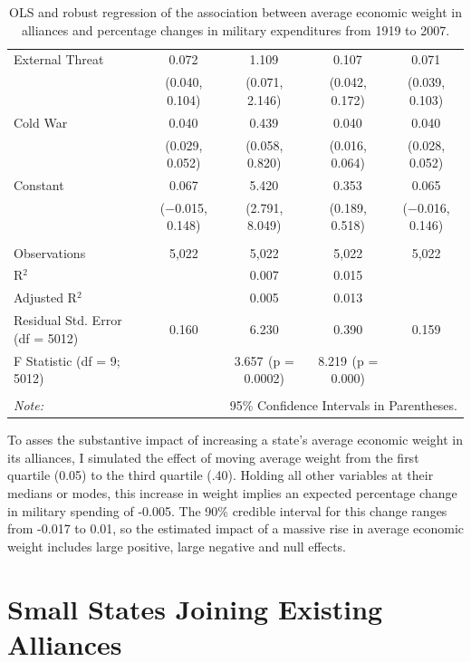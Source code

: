 \documentclass[12pt]{article}
\begin{document}
\begin{table}[!htbp]
\begin{tabular}{@{\extracolsep{0pt}}lcccc}
  External Threat & 0.072$^{}$ & 1.109$^{}$ & 0.107$^{}$ & 0.071$^{}$ \\ 
  & (0.040, 0.104) & (0.071, 2.146) & (0.042, 0.172) & (0.039, 0.103) \\ 
  Cold War & 0.040$^{}$ & 0.439$^{}$ & 0.040$^{}$ & 0.040$^{}$ \\ 
  & (0.029, 0.052) & (0.058, 0.820) & (0.016, 0.064) & (0.028, 0.052) \\ 
  Constant & 0.067 & 5.420$^{}$ & 0.353$^{}$ & 0.065 \\ 
  & ($-$0.015, 0.148) & (2.791, 8.049) & (0.189, 0.518) & ($-$0.016, 0.146) \\ 
 \hline \\[-1.8ex] 
Observations & 5,022 & 5,022 & 5,022 & 5,022 \\ 
R$^{2}$ &  & 0.007 & 0.015 &  \\ 
Adjusted R$^{2}$ &  & 0.005 & 0.013 &  \\ 
Residual Std. Error (df = 5012) & 0.160 & 6.230 & 0.390 & 0.159 \\ 
F Statistic (df = 9; 5012) &  & 3.657$^{}$  (p = 0.0002) & 8.219$^{}$  (p = 0.000) &  \\ 
\hline 
\hline \\[-1.8ex] 
\textit{Note:}  & \multicolumn{4}{r}{95\% Confidence Intervals in Parentheses.} \\ 
\end{tabular} 
  \caption{OLS and robust regression of the association between average economic weight in alliances
and percentage changes in military expenditures from 1919 to 2007.} 
  \label{tab:avg-weight-res} 
\end{table} 


To asses the substantive impact of increasing a state's average economic weight in its alliances, I simulated the effect of moving average weight from the first quartile (0.05) to the third quartile (.40). 
Holding all other variables at their medians or modes, this increase in weight implies an expected percentage change in military spending of -0.005. 
The 90\% credible interval for this change ranges from -0.017 to 0.01, so the estimated impact of a massive rise in average economic weight includes large positive, large negative and null effects. 


\section{Small States Joining Existing Alliances} 
\end{document}

